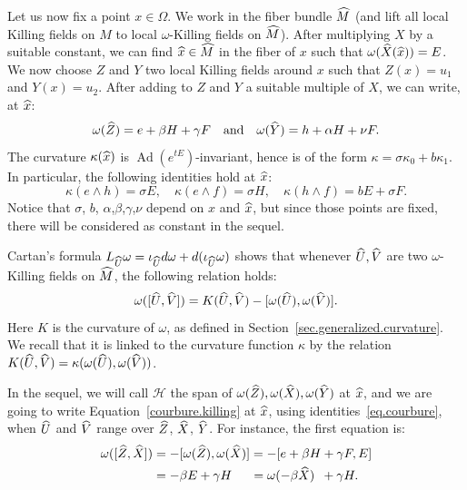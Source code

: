 \documentclass[11pt]{article}
\theoremstyle{definition}
\numberwithin{equation}{section}
\numberwithin{figure}{section}
\numberwithin{table}{section}
\DeclareMathOperator{\Ad}{Ad}
\newcommand{\hm}{{\hat{M}}}
\newcommand{\hx}{{\hat{x}}}
\let\oldhat\hat
\renewcommand*\hat[1]{\mathchoice{\widehat{#1}}{\widehat{#1}}{\widehat{#1}}{\oldhat{#1}}}
\begin{document}
Let us now fix a point $x \in \Omega$. We work in the fiber bundle $\hm$ (and lift all local Killing fields on $M$ to local $\omega$-Killing fields on $\hm$). After multiplying $X$ by a suitable constant, we can find $\hx \in \hm$ in the fiber of $x$ such that $\omega(\hat{X}(\hx))=E$. We now choose $Z$ and $Y$ two local Killing fields around $x$ such that $Z(x)=u_1$ and $Y(x)=u_2$. After adding to $Z$ and $Y$ a suitable multiple of $X$, we can write, at $\hx$:
\[
\omega(\hat{Z})=e+\beta H + \gamma F \quad \text{and}\quad \omega(\hat{Y})=h+\alpha H +\nu F.
\]
The curvature $\kappa(\hx)$ is $\Ad(e^{tE})$-invariant, hence is of the form $\kappa=\sigma \kappa_0 +b \kappa_1$. In particular, the following identities hold at $\hx$:
\begin{equation}\label{eq.courbure}
\kappa(e \wedge h)= \sigma E, \quad \kappa(e \wedge f)=\sigma H, \quad \kappa(h \wedge f)=bE+\sigma F.
\end{equation}
Notice that $\sigma$, $b$, $\alpha$,$\beta$,$\gamma$,$\nu$ depend on $x$ and $\hx$, but since those points are fixed, there will be considered as constant in the sequel.



Cartan's formula $L_{\hat{U}} \omega= \iota_{\hat{U}} d \omega + d(\iota_{\hat{U}} \omega)$ shows that whenever $\hat{U},\hat{V}$ are two $\omega$-Killing fields on $\hm$, the following relation holds:
\begin{equation}\label{courbure.killing}
\omega([\hat{U},\hat{V}])=K(\hat{U},\hat{V})-[\omega(\hat{U}),\omega(\hat{V})].
\end{equation}
Here $K$ is the curvature of $\omega$, as defined in Section~\ref{sec.generalized.curvature}. We recall that it is linked to the curvature function $\kappa$ by the relation $K(\hat{U},\hat{V})=\kappa(\omega(\hat{U}),\omega(\hat{V}))$.

In the sequel, we will call ${\mathcal H}$ the span of $\omega(\hat{Z}),\omega(\hat{X}),\omega(\hat{Y})$ at $\hx$, and we are going to write Equation~\eqref{courbure.killing} at $\hx$, using identities~\eqref{eq.courbure}, when $\hat{U}$ and $\hat{V}$ range over $\hat{Z}$, $\hat{X}$, $\hat{Y}$. For instance, the first equation is:
\begin{align*}
\omega([\hat{Z},\hat{X}])&=-[\omega(\hat{Z}),\omega(\hat{X})] = -[e+ \beta H + \gamma F,E] \\
&= - \beta E + \gamma H \quad\;\,= \omega(- \beta \hat{X}) \;\:+ \gamma H.
\end{align*}
\end{document}
